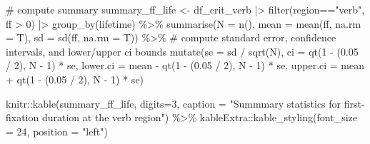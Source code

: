 \documentclass[
  letterpaper,
  DIV=11,
  numbers=noendperiod]{scrartcl}
\newenvironment{Shaded}{\begin{snugshade}}{\end{snugshade}}
\newcommand{\AttributeTok}[1]{\textcolor[rgb]{0.40,0.45,0.13}{#1}}
\newcommand{\CommentTok}[1]{\textcolor[rgb]{0.37,0.37,0.37}{#1}}
\newcommand{\DecValTok}[1]{\textcolor[rgb]{0.68,0.00,0.00}{#1}}
\newcommand{\FloatTok}[1]{\textcolor[rgb]{0.68,0.00,0.00}{#1}}
\newcommand{\FunctionTok}[1]{\textcolor[rgb]{0.28,0.35,0.67}{#1}}
\newcommand{\NormalTok}[1]{\textcolor[rgb]{0.00,0.23,0.31}{#1}}
\newcommand{\OtherTok}[1]{\textcolor[rgb]{0.00,0.23,0.31}{#1}}
\newcommand{\SpecialCharTok}[1]{\textcolor[rgb]{0.37,0.37,0.37}{#1}}
\newcommand{\StringTok}[1]{\textcolor[rgb]{0.13,0.47,0.30}{#1}}
\begin{document}
\begin{Shaded}
\begin{Highlighting}[]
\CommentTok{\# compute summary }
\NormalTok{summary\_ff\_life }\OtherTok{\textless{}{-}}\NormalTok{ df\_crit\_verb }\SpecialCharTok{|\textgreater{}} 
  \FunctionTok{filter}\NormalTok{(region}\SpecialCharTok{==}\StringTok{"verb"}\NormalTok{,}
\NormalTok{         ff }\SpecialCharTok{\textgreater{}} \DecValTok{0}\NormalTok{) }\SpecialCharTok{|\textgreater{}} 
  \FunctionTok{group\_by}\NormalTok{(lifetime) }\SpecialCharTok{\%\textgreater{}\%}
  \FunctionTok{summarise}\NormalTok{(}\AttributeTok{N =} \FunctionTok{n}\NormalTok{(),}
            \AttributeTok{mean =} \FunctionTok{mean}\NormalTok{(ff, }\AttributeTok{na.rm =}\NormalTok{ T),}
            \AttributeTok{sd =} \FunctionTok{sd}\NormalTok{(ff, }\AttributeTok{na.rm =}\NormalTok{ T)) }\SpecialCharTok{\%\textgreater{}\%}
  \CommentTok{\# compute standard error, confidence intervals, and lower/upper ci bounds}
  \FunctionTok{mutate}\NormalTok{(}\AttributeTok{se =}\NormalTok{ sd }\SpecialCharTok{/} \FunctionTok{sqrt}\NormalTok{(N),}
         \AttributeTok{ci =} \FunctionTok{qt}\NormalTok{(}\DecValTok{1} \SpecialCharTok{{-}}\NormalTok{ (}\FloatTok{0.05} \SpecialCharTok{/} \DecValTok{2}\NormalTok{), N }\SpecialCharTok{{-}} \DecValTok{1}\NormalTok{) }\SpecialCharTok{*}\NormalTok{ se,}
         \AttributeTok{lower.ci =}\NormalTok{ mean }\SpecialCharTok{{-}} \FunctionTok{qt}\NormalTok{(}\DecValTok{1} \SpecialCharTok{{-}}\NormalTok{ (}\FloatTok{0.05} \SpecialCharTok{/} \DecValTok{2}\NormalTok{), N }\SpecialCharTok{{-}} \DecValTok{1}\NormalTok{) }\SpecialCharTok{*}\NormalTok{ se,}
         \AttributeTok{upper.ci =}\NormalTok{ mean }\SpecialCharTok{+} \FunctionTok{qt}\NormalTok{(}\DecValTok{1} \SpecialCharTok{{-}}\NormalTok{ (}\FloatTok{0.05} \SpecialCharTok{/} \DecValTok{2}\NormalTok{), N }\SpecialCharTok{{-}} \DecValTok{1}\NormalTok{) }\SpecialCharTok{*}\NormalTok{ se)}

\NormalTok{knitr}\SpecialCharTok{::}\FunctionTok{kable}\NormalTok{(summary\_ff\_life, }\AttributeTok{digits=}\DecValTok{3}\NormalTok{,}
             \AttributeTok{caption =} \StringTok{"Summmary statistics for first{-}fixation duration at the verb region"}\NormalTok{) }\SpecialCharTok{\%\textgreater{}\%} 
\NormalTok{  kableExtra}\SpecialCharTok{::}\FunctionTok{kable\_styling}\NormalTok{(}\AttributeTok{font\_size =} \DecValTok{24}\NormalTok{,}
                            \AttributeTok{position =} \StringTok{"left"}\NormalTok{)}
\end{Highlighting}
\end{Shaded}
\end{document}
